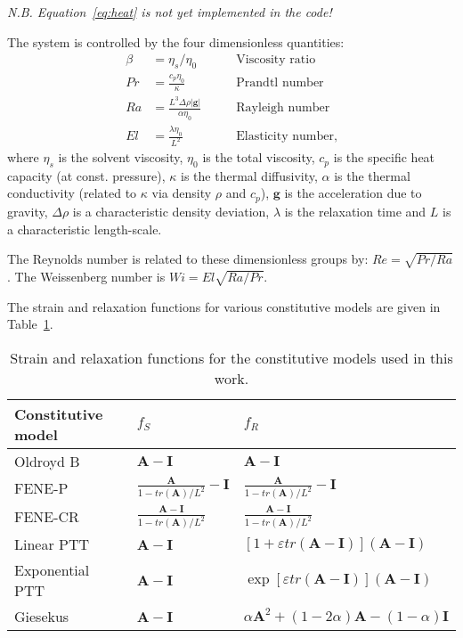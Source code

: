\documentclass[notitlepage]{revtex4-2}
\begin{document}
\emph{N.B. Equation~\eqref{eq:heat} is not yet implemented in the code!}

The system is controlled by the four dimensionless quantities:
\begin{subequations}
\begin{align}\beta&=\eta_{s}/\eta_{0}\qquad&\text{Viscosity ratio}\\
Pr&=\frac{c_{p}\eta_{0}}{\kappa}\qquad&\text{Prandtl number}\\
Ra&=\frac{L^{3}\Delta\rho\left\lvert\bm{g}\right\rvert}{\alpha\eta_{0}}\qquad&\text{Rayleigh number}\\
El&=\frac{\lambda\eta_{0}}{L^{2}}\qquad&\text{Elasticity number},
\end{align}\end{subequations}
where $\eta_{s}$ is the solvent viscosity, $\eta_{0}$ is the total viscosity, $c_{p}$ is the specific heat capacity (at const. pressure), $\kappa$ is the thermal diffusivity, $\alpha$ is the thermal conductivity (related to $\kappa$ via density $\rho$ and $c_{p}$), $\bm{g}$ is the acceleration due to gravity, $\Delta\rho$ is a characteristic density deviation, $\lambda$ is the relaxation time and $L$ is a characteristic length-scale.

The Reynolds number is related to these dimensionless groups by: $Re=\sqrt{Pr/Ra}$. The Weissenberg number is $Wi=El\sqrt{Ra/Pr}$.

The strain and relaxation functions for various constitutive models are given in Table~\ref{tab:cm}.

\begin{table}
\begin{center}
\caption{Strain and relaxation functions for the constitutive models used in this work.\label{tab:cm}}
\begin{tabular}{|l|l|l|}
Constitutive model & $f_{S}$& $f_{R}$\\
\hline
Oldroyd B & $\bm{A}-\bm{I}$ & $\bm{A}-\bm{I}$ \\
FENE-P & $\frac{\bm{A}}{1-tr\left(\bm{A}\right)/L^{2}}-\bm{I}$ & $\frac{\bm{A}}{1-tr\left(\bm{A}\right)/L^{2}}-\bm{I}$ \\
FENE-CR & $\frac{\bm{A}-\bm{I}}{1-tr\left(\bm{A}\right)/L^{2}}$ & $\frac{\bm{A}-\bm{I}}{1-tr\left(\bm{A}\right)/L^{2}}$ \\
Linear PTT & $\bm{A}-\bm{I}$ & $\left[1+\varepsilon{tr}\left(\bm{A}-\bm{I}\right)\right]\left(\bm{A}-\bm{I}\right)$ \\
Exponential PTT & $\bm{A}-\bm{I}$ & $\exp\left[\varepsilon{tr}\left(\bm{A}-\bm{I}\right)\right]\left(\bm{A}-\bm{I}\right)$ \\
Giesekus & $\bm{A}-\bm{I}$ & $\alpha\bm{A}^{2}+\left(1-2\alpha\right)\bm{A}-\left(1-\alpha\right)\bm{I}$ \\
\end{tabular}
\end{center}
\end{table}
\end{document}

